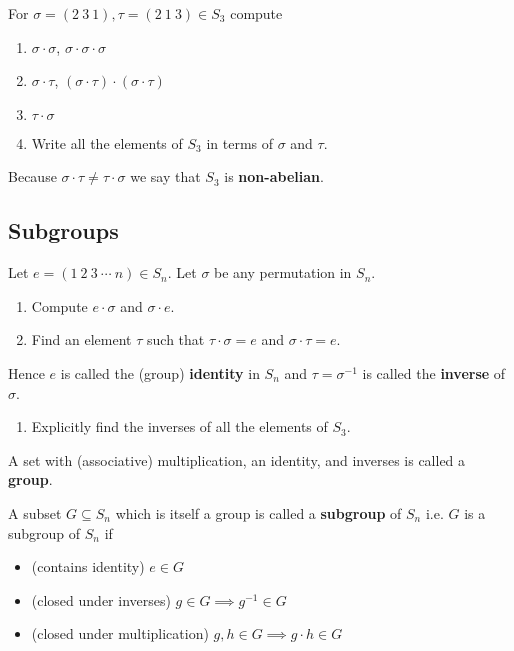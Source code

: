\begin{questions}[resume]
  \item For $ \sigma = (2 \: 3 \: 1), \tau = (2 \: 1 \: 3) \in S_3$ compute 
  \begin{enumerate}
    \item $ \sigma \cdot \sigma$, $ \sigma \cdot \sigma \cdot \sigma$
    \item $ \sigma \cdot \tau$, $ (\sigma \cdot \tau) \cdot (\sigma \cdot \tau)$
    \item $ \tau \cdot \sigma$
    \item Write all the elements of $ S_3$ in terms of $ \sigma$ and $ \tau$.
  \end{enumerate}
  Because $\sigma \cdot \tau \neq \tau \cdot \sigma$ we say that $ S_3$ is \textbf{non-abelian}.
\end{questions}





\newpage
\subsection{Subgroups}
\begin{questions}[resume]
  \item Let $ e = (1 \: 2 \: 3 \: \cdots \: n) \in S_n$. Let $ \sigma $ be any permutation in $ S_n$.
  \begin{enumerate}
    \item Compute $ e \cdot \sigma$ and $ \sigma \cdot e$.
    \item Find an element $ \tau$ such that $ \tau \cdot \sigma = e$ and $ \sigma \cdot \tau = e$.
  \end{enumerate}
  Hence $ e$ is called the (group) \textbf{identity} in $ S_n$ and $ \tau = \sigma^{-1}$ is called the \textbf{inverse} of $ \sigma$.
  \begin{enumerate}[resume]
    \item Explicitly find the inverses of all the elements of $ S_3$.
  \end{enumerate}
\end{questions}
A set with (associative)  multiplication, an identity, and inverses is called a \textbf{group}.

A subset $ G \subseteq S_n$ which is itself a group is called a \textbf{subgroup} of $ S_n$ i.e. $ G$ is a subgroup of $ S_n$ if 
\begin{itemize}
  \item (contains identity) $ e \in G$
  \item (closed under inverses) $ g \in G \implies g^{-1} \in G$
  \item (closed under multiplication) $ g,h \in G \implies g \cdot h \in G$
\end{itemize}

